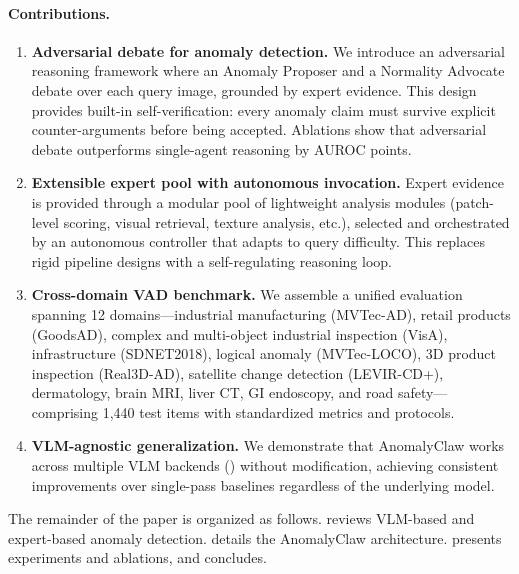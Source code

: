\paragraph{Contributions.}
\begin{enumerate}[leftmargin=*,itemsep=2pt,topsep=3pt]
    \item \textbf{Adversarial debate for anomaly detection.}
    We introduce an adversarial reasoning framework where an Anomaly Proposer and a Normality Advocate debate over each query image, grounded by expert evidence.
    This design provides built-in self-verification: every anomaly claim must survive explicit counter-arguments before being accepted.
    Ablations show that adversarial debate outperforms single-agent reasoning by  AUROC points.

    \item \textbf{Extensible expert pool with autonomous invocation.}
    Expert evidence is provided through a modular pool of lightweight analysis modules (patch-level scoring, visual retrieval, texture analysis, etc.), selected and orchestrated by an autonomous controller that adapts to query difficulty.
    This replaces rigid pipeline designs with a self-regulating reasoning loop.

    \item \textbf{Cross-domain VAD benchmark.}
    We assemble a unified evaluation spanning 12 domains---industrial manufacturing (MVTec-AD), retail products (GoodsAD), complex and multi-object industrial inspection (VisA), infrastructure (SDNET2018), logical anomaly (MVTec-LOCO), 3D product inspection (Real3D-AD), satellite change detection (LEVIR-CD+), dermatology, brain MRI, liver CT, GI endoscopy, and road safety---comprising 1{,}440 test items with standardized metrics and protocols.

    \item \textbf{VLM-agnostic generalization.}
    We demonstrate that AnomalyClaw works across multiple VLM backends () without modification, achieving consistent improvements over single-pass baselines regardless of the underlying model.
\end{enumerate}

The remainder of the paper is organized as follows.
 reviews VLM-based and expert-based anomaly detection.
 details the AnomalyClaw architecture.
 presents experiments and ablations, and  concludes.
